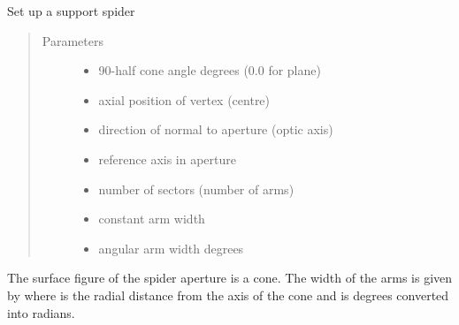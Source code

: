 \documentclass[letterpaper,10pt,english]{sphinxmanual}
\begin{document}
\begin{fulllineitems}
\label{\detokenize{xsrt_functions:xsrt.spider}}
Set up a support spider
\begin{quote}\begin{description}
\item[{Parameters}] \leavevmode\begin{itemize}
\item {} 
 \textendash{} 90-half cone angle degrees (0.0 for plane)

\item {} 
 \textendash{} axial position of vertex (centre)

\item {} 
 \textendash{} direction of normal to aperture (optic axis)

\item {} 
 \textendash{} reference axis in aperture

\item {} 
 \textendash{} number of sectors (number of arms)

\item {} 
 \textendash{} constant arm width

\item {} 
 \textendash{} angular arm width degrees

\end{itemize}

\end{description}\end{quote}

The surface figure of the spider aperture is a cone.
The width of the arms is given by 
where  is the radial distance
from the axis of the cone and  is 
degrees converted into radians.

\end{fulllineitems}

\end{document}

